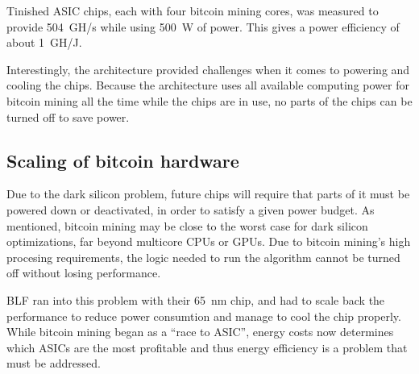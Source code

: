 Tinished ASIC chips, each with four bitcoin mining cores, was measured to provide 504~GH/s while using
500~W of power. This gives a power efficiency of about 1~GH/J.

Interestingly, the architecture provided challenges when it comes to powering and cooling the chips.
Because the architecture uses all available computing power for bitcoin mining all the time while
the chips are in use, no parts of the chips can be turned off to save power. \cite{goldstrike}


\subsection{Scaling of bitcoin hardware}
Due to the dark silicon problem, future chips will require that parts of it must be powered down or deactivated,
in order to satisfy a given power budget\cite{dark-silicon2}. As mentioned, bitcoin mining may be close to
the worst case for dark silicon optimizations, far beyond multicore CPUs or GPUs. Due to bitcoin mining's high procesing requirements, the logic needed to run the algorithm cannot be turned off without losing
performance.

BLF ran into this problem with their 65~nm chip, and had to scale back the performance to reduce power consumtion
and manage to cool the chip properly. While bitcoin mining began as a ``race to ASIC'', energy costs now determines
which ASICs are the most profitable and thus energy efficiency is a problem that must be addressed. \cite{bespoke-silicon}

%
%
%       
%
%

